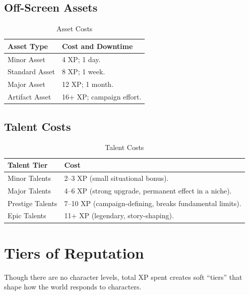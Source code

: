 \subsection{Off-Screen Assets}\label{subsec:off_screen_assets_costs}

\begin{longtable}{p{3.5cm} p{9cm}}
\caption{Asset Costs}\label{tab:asset_costs}\\
\toprule
\textbf{Asset Type} & \textbf{Cost and Downtime} \\
\midrule
Minor Asset & 4 XP; 1 day. \\
Standard Asset & 8 XP; 1 week. \\
Major Asset & 12 XP; 1 month. \\
Artifact Asset & 16+ XP; campaign effort. \\
\bottomrule
\end{longtable}

\subsection{Talent Costs}\label{subsec:talent_costs}

\begin{longtable}{p{3.5cm} p{9cm}}
\caption{Talent Costs}\label{tab:talent_costs}\\
\toprule
\textbf{Talent Tier} & \textbf{Cost} \\
\midrule
Minor Talents & 2--3 XP (small situational bonus). \\
Major Talents & 4--6 XP (strong upgrade, permanent effect in a niche). \\
Prestige Talents & 7--10 XP (campaign-defining, breaks fundamental limits). \\
Epic Talents & 11+ XP (legendary, story-shaping). \\
\bottomrule
\end{longtable}

\section{Tiers of Reputation}\label{sec:reputation_tiers}

Though there are no character levels, total XP spent creates soft ``tiers'' that shape how the world responds to characters.

